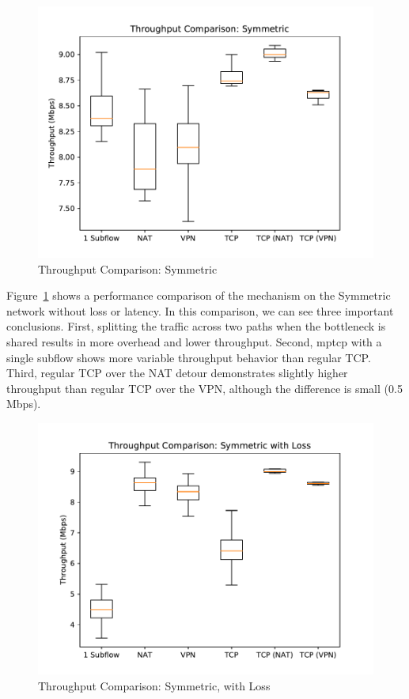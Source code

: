 \documentclass{cwru}
\begin{document}
\begin{figure}
  \centering
  \includegraphics{figures/sym.pdf}
  \caption{Throughput Comparison: Symmetric}
  \label{fig:sym}
\end{figure}

Figure~\ref{fig:sym} shows a performance comparison of the mechanism on the
Symmetric network without loss or latency. In this comparison, we can see three
important conclusions. First, splitting the traffic across two paths when the
bottleneck is shared results in more overhead and lower throughput. Second,
\ac{mptcp} with a single subflow shows more variable throughput behavior than
regular TCP. Third, regular TCP over the NAT detour demonstrates slightly higher
throughput than regular TCP over the VPN, although the difference is small (0.5
Mbps).

\begin{figure}
  \centering
  \includegraphics{figures/sym_lossy.pdf}
  \caption{Throughput Comparison: Symmetric, with Loss}
  \label{fig:sym_lossy}
\end{figure}
\end{document}
